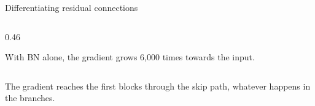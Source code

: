 \documentclass[11pt,aspectratio=169]{beamer}
\begin{document}
\begin{frame}{Differentiating residual connections}
\begin{columns}[c,onlytextwidth]
\begin{column}{0.46\textwidth}
            {\scriptsize With BN alone, the gradient grows 6{,}000 times towards the input.\par}
        \end{column}
    \end{columns}

    \begin{tcolorbox}[nndsgreen]
        The gradient reaches the first blocks through the skip path, whatever
        happens in the branches.
    \end{tcolorbox}


\end{frame}

\end{document}
